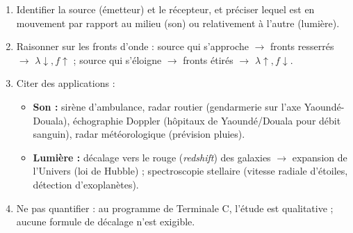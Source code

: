 \documentclass[11pt]{article}
\newcommand{\cle}[1]{{\popxbold\color{popdark}#1}}
\begin{document}
\begin{methode}
\begin{enumerate}
\item \cle{Identifier} la source (émetteur) et le récepteur, et préciser lequel est en mouvement par rapport au milieu (son) ou relativement à l'autre (lumière).
\item \cle{Raisonner sur les fronts d'onde} : source qui s'approche $\rightarrow$ fronts resserrés $\rightarrow$ $\lambda \downarrow, f \uparrow$ ; source qui s'éloigne $\rightarrow$ fronts étirés $\rightarrow$ $\lambda \uparrow, f \downarrow$.
\item \cle{Citer des applications} :
\begin{itemize}
\item \textbf{Son :} sirène d'ambulance, radar routier (gendarmerie sur l'axe Yaoundé-Douala), échographie Doppler (hôpitaux de Yaoundé/Douala pour débit sanguin), radar météorologique (prévision pluies).
\item \textbf{Lumière :} décalage vers le rouge (\emph{redshift}) des galaxies $\rightarrow$ expansion de l'Univers (loi de Hubble) ; spectroscopie stellaire (vitesse radiale d'étoiles, détection d'exoplanètes).
\end{itemize}
\item \cle{Ne pas quantifier} : au programme de Terminale C, l'étude est qualitative ; aucune formule de décalage n'est exigible.
\end{enumerate}
\end{methode}
\end{document}
